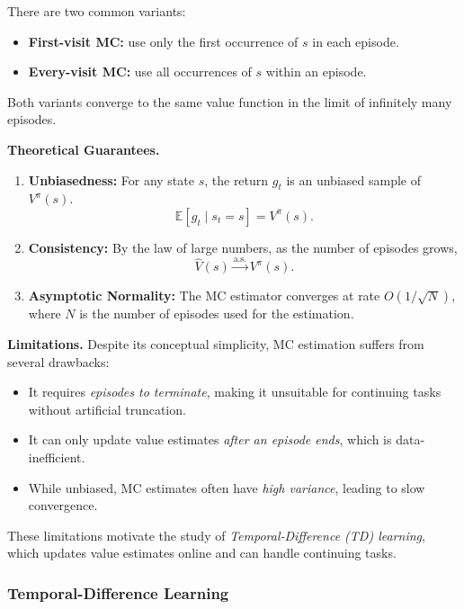 \documentclass[
]{book}
\providecommand{\tightlist}{%
  \setlength{\itemsep}{0pt}\setlength{\parskip}{0pt}}
\theoremstyle{definition}
\theoremstyle{definition}
\theoremstyle{definition}
\theoremstyle{definition}
\theoremstyle{remark}
\begin{document}
There are two common variants:

\begin{itemize}
\tightlist
\item
  \textbf{First-visit MC:} use only the first occurrence of \(s\) in each episode.\\
\item
  \textbf{Every-visit MC:} use all occurrences of \(s\) within an episode.
\end{itemize}

Both variants converge to the same value function in the limit of infinitely many episodes.

\textbf{Theoretical Guarantees.}

\begin{enumerate}
\def\labelenumi{\arabic{enumi}.}
\tightlist
\item
  \textbf{Unbiasedness:} For any state \(s\), the return \(g_t\) is an unbiased sample of \(V^\pi(s)\).\\
  \[
  \mathbb{E}[g_t \mid s_t = s] = V^\pi(s).
  \]
\item
  \textbf{Consistency:} By the law of large numbers, as the number of episodes grows,
  \[
  \hat{V}(s) \xrightarrow{\text{a.s.}} V^\pi(s).
  \]
\item
  \textbf{Asymptotic Normality:} The MC estimator converges at rate \(O(1/\sqrt{N})\), where \(N\) is the number of episodes used for the estimation.
\end{enumerate}

\textbf{Limitations.} Despite its conceptual simplicity, MC estimation suffers from several drawbacks:

\begin{itemize}
\item
  It requires \emph{episodes to terminate}, making it unsuitable for continuing tasks without artificial truncation.
\item
  It can only update value estimates \emph{after an episode ends}, which is data-inefficient.
\item
  While unbiased, MC estimates often have \emph{high variance}, leading to slow convergence.
\end{itemize}

These limitations motivate the study of \emph{Temporal-Difference (TD) learning}, which updates value estimates online and can handle continuing tasks.

\subsubsection{Temporal-Difference Learning}\label{temporal-difference-learning}
\end{document}
